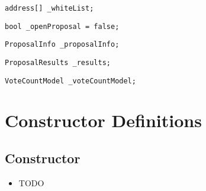 \begin{lstlisting}[firstnumber=24]
    address[] _whiteList;
\end{lstlisting}

\begin{lstlisting}[firstnumber=25]
    bool _openProposal = false;
\end{lstlisting}

\begin{lstlisting}[firstnumber=27]
    ProposalInfo _proposalInfo;
\end{lstlisting}

\begin{lstlisting}[firstnumber=29]
    ProposalResults _results;
\end{lstlisting}

\begin{lstlisting}[firstnumber=30]
    VoteCountModel _voteCountModel;
\end{lstlisting}

\section{Constructor Definitions}


\subsection{Constructor}

\begin{itemize}
\item TODO
\end{itemize}

